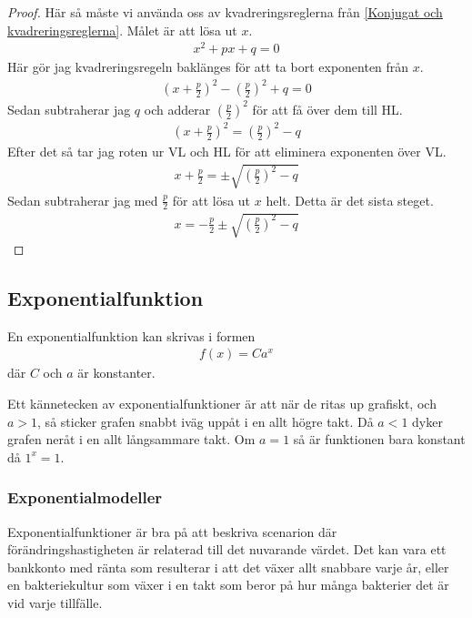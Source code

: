\begin{proof}
Här så måste vi använda oss av kvadreringsreglerna från \ref{Konjugat och kvadreringsreglerna}. Målet är att lösa ut $x$.
\begin{align}
	x^2+px+q = 0
\end{align}
Här gör jag kvadreringsregeln baklänges för att ta bort exponenten från $x$.
\begin{align}
	\left(x+\frac{p}{2}\right)^2-\left(\frac{p}{2}\right)^2+q = 0
\end{align}
Sedan subtraherar jag $q$ och adderar $\left(\frac{p}{2}\right)^2$ för att få över dem till HL.
\begin{align}
	\left(x+\frac{p}{2}\right)^2 = \left(\frac{p}{2}\right)^2 - q
\end{align}
Efter det så tar jag roten ur VL och HL för att eliminera exponenten över VL.
\begin{align}
	x+\frac{p}{2} = \pm \sqrt{\left(\frac{p}{2}\right)^2 - q}
\end{align}
Sedan subtraherar jag med $\frac{p}{2}$ för att lösa ut $x$ helt. Detta är det sista steget.
\begin{align}
	x = -\frac{p}{2}\pm \sqrt{\left(\frac{p}{2}\right)^2 - q}
\end{align}
\end{proof}

\newpage
\subsection{Exponentialfunktion}

\begin{definition}
	En exponentialfunktion kan skrivas i formen
	\begin{align}
		f(x)=Ca^x
	\end{align}
	där $C$ och $a$ är konstanter.
 \end{definition}
 

Ett kännetecken av exponentialfunktioner är att när de ritas up grafiskt, och $a > 1$, så sticker grafen snabbt iväg uppåt i en allt högre takt. Då $a < 1$ dyker grafen neråt i en allt långsammare takt. Om $a=1$ så är funktionen bara konstant då $1^x=1$.

\subsubsection{Exponentialmodeller}

Exponentialfunktioner är bra på att beskriva scenarion där förändringshastigheten är relaterad till det nuvarande värdet. Det kan vara ett bankkonto med ränta som resulterar i att det växer allt snabbare varje år, eller en bakteriekultur som växer i en takt som beror på hur många bakterier det är vid varje tillfälle.

